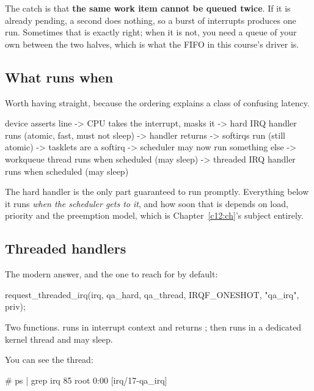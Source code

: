 The catch is that \textbf{the same work item cannot be queued twice}. If it is already pending, a
second  does nothing, so a burst of interrupts produces one run. Sometimes that
is exactly right; when it is not, you need a queue of your own between the two halves, which is what
the FIFO in this course's driver is.

\subsection{What runs when}
\label{c8:app:b3}

Worth having straight, because the ordering explains a class of confusing latency.

\begin{console}
device asserts line
  -> CPU takes the interrupt, masks it
     -> hard IRQ handler runs          (atomic, fast, must not sleep)
  -> handler returns
     -> softirqs run                   (still atomic)
        -> tasklets are a softirq
     -> scheduler may now run something else
        -> workqueue thread runs when scheduled   (may sleep)
        -> threaded IRQ handler runs when scheduled (may sleep)
\end{console}

\noindent The hard handler is the only part guaranteed to run promptly. Everything below it runs
\emph{when the scheduler gets to it}, and how soon that is depends on load, priority and the
preemption model, which is Chapter~\ref{c12:ch}'s subject entirely.

\subsection{Threaded handlers}
\label{c8:app:b4}

The modern answer, and the one to reach for by default:

\begin{ccode}
request_threaded_irq(irq, qa_hard, qa_thread, IRQF_ONESHOT, "qa_irq", priv);
\end{ccode}

\noindent Two functions.  runs in interrupt context and returns
;  then runs in a dedicated kernel thread and may sleep.

You can see the thread:

\begin{console}
# ps | grep irq
   85 root      0:00 [irq/17-qa_irq]
\end{console}

